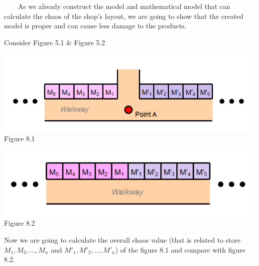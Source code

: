\ \ \ \ As we already construct the model and mathematical model that can calculate the chaos of the shop's layout, we are going to show that the created model is proper and can cause less damage to the products. 
\newline \par
Consider Figure 5.1 \& Figure 5.2
\begin{center}
\includegraphics[width=\textwidth]{fig5.1.PNG}
Figure 8.1
\end{center}
\begin{center}
\includegraphics[width=\textwidth]{fig5.2.PNG}
Figure 8.2
\end{center}
\par
Now we are going to calculate the overall chaos value (that is related to store $M_1,M_2,\hdots,M_n$ and $M'_1,M'_2,\hdots,M'_n$) of the figure 8.1 and compare with figure 8.2.

